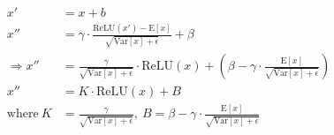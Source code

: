 \begin{equation*}
    \begin{aligned}
        x'                & = x + b                                                                                                                                           \\
        x''               & = \gamma \cdot \frac {\mathrm{ReLU} (x') - \mathrm{E}[x]}{\sqrt{\mathrm{Var}[x]+\epsilon}}+\beta\,                                                \\
        \Rightarrow
        x''               & = \frac{\gamma}{\sqrt{\mathrm{Var}[x]+\epsilon}}\cdot \mathrm{ReLU}(x) + (\beta-\gamma\cdot\frac{\mathrm{E}[x]}{\sqrt{\mathrm{Var}[x]+\epsilon}}) \\
        x''               & =K\cdot\mathrm{ReLU}(x) + B\,                                                                                                                     \\
        \mathrm{where}\ K & =\frac{\gamma}{\sqrt{\mathrm{Var}[x]+\epsilon}},\
        B=\beta-\gamma\cdot\frac{\mathrm{E}[x]}{\sqrt{\mathrm{Var}[x]+\epsilon}}
    \end{aligned}
\end{equation*}







